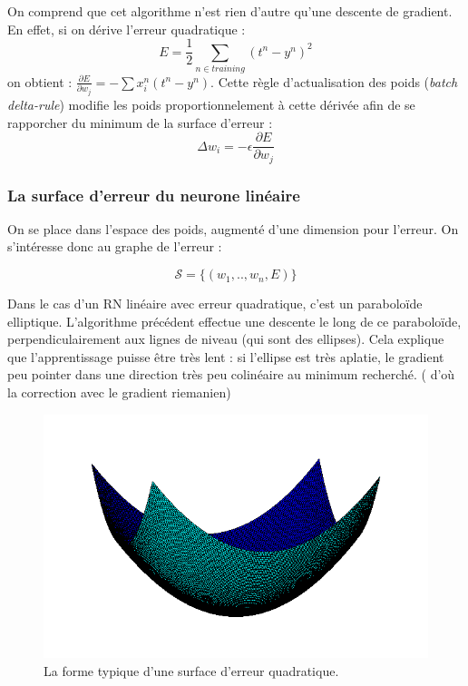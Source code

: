 \documentclass{article}
\theoremstyle{definition}
\begin{document}
On comprend que cet algorithme n'est rien d'autre qu'une descente de gradient. En effet, si on dérive l'erreur quadratique : \[E=\frac{1}{2}\sum_{n\in training}(t^n-y^n)^2\]
on obtient : $\frac{\partial E}{\partial w_j}=-\sum x_i^n(t^n-y^n)$. Cette règle d'actualisation des poids (\textit{batch delta-rule}) modifie les poids proportionnelement à cette dérivée afin de se rapporcher du minimum de la surface d'erreur :
\[\Delta w_i =-\epsilon \frac{\partial E}{\partial w_j}\]


\subsubsection{La surface d'erreur du neurone linéaire}
On se place dans l'espace des poids, augmenté d'une dimension pour l'erreur. On s'intéresse donc au graphe de l'erreur :

\[\mathcal S = \{(w_1,..,w_n,E)\}\]

Dans le cas d'un RN linéaire avec erreur quadratique, c'est un paraboloïde elliptique. L'algorithme précédent effectue une descente le long de ce paraboloïde, perpendiculairement aux lignes de niveau (qui sont des ellipses). Cela explique que l'apprentissage puisse être très lent : si l'ellipse est très aplatie, le gradient peu pointer dans une direction très peu colinéaire au minimum recherché. ( d'où la correction avec le gradient riemanien)

\newpage
\begin{figure}[!h]\centering
\includegraphics[scale=0.5]{Surfaceerreur.png}
\caption{La forme typique d'une surface d'erreur quadratique.}
\label{fig:Surface}
\end{figure}
\end{document}

